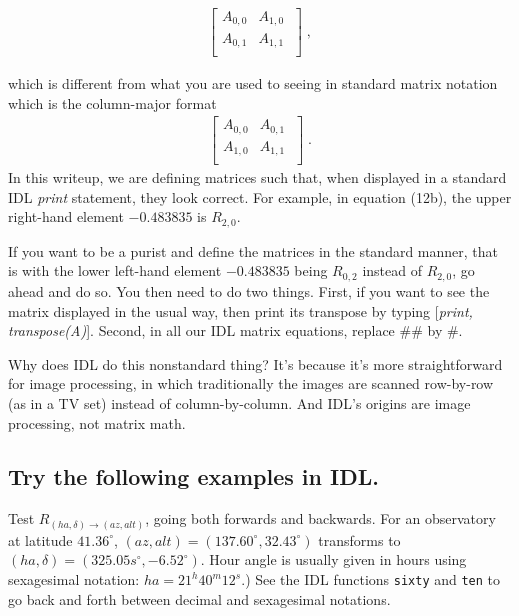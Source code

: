 \documentclass[]{article}
\begin{document}
\begin{eqnarray} 
\left[ 
\begin{array}{rrr}
A_{0,0} & A_{1,0} \\
A_{0,1} & A_{1,1} \\
\end{array} 
\; \right] \; ,
\end{eqnarray} 

\noindent which is different from what you are used to seeing in
standard matrix notation which is the column-major format
\begin{eqnarray} 
\left[ 
\begin{array}{rrr}
A_{0,0} & A_{0,1} \\
A_{1,0} & A_{1,1} \\
\end{array} 
\; \right] \; .
\end{eqnarray} 
    In this writeup, we are defining matrices such that, when
displayed in a standard IDL {\it print} statement, they look correct.
For example, in equation (12b), the upper right-hand element $-0.483835$
is $R_{2,0}$. 

    If you want to be a purist and define the matrices in the
standard manner, that is with the lower left-hand element $-0.483835$
being $R_{0,2}$ instead of $R_{2,0}$, go ahead and do so.  You then need
to do two things.  First, if you want to see the matrix displayed in the
usual way, then print its transpose by typing [{\it print,
transpose(A)}].  Second, in all our IDL matrix equations, replace ${
\# \#}$ by ${ \#}$. 

    Why does IDL do this nonstandard thing? It's because it's more
straightforward for image processing, in which traditionally the images
are scanned row-by-row (as in a TV set) instead of column-by-column. And
IDL's origins are image processing, not matrix math.

\subsection {Try the following examples in IDL.}

Test ${R}_{(ha, \delta) \rightarrow (az, alt)}$, going both forwards
and backwards. For an observatory at latitude $41.36^\circ$,
$(az,alt)=(137.60^\circ,32.43^\circ)$ transforms to
$(ha,\delta)=(325.05s^\circ, -6.52^\circ)$.  Hour angle is usually given
in hours using sexagesimal notation: $ha=21^h40^m12^{s}$.) See the IDL
functions {\tt sixty} and {\tt ten} to go back and forth between decimal
and sexagesimal notations.
\end{document}
